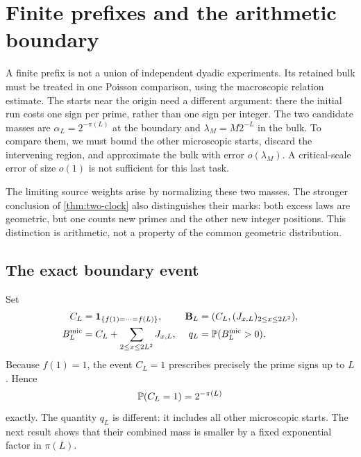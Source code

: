\section{Finite prefixes and the arithmetic boundary}\label{sec:global-prefix}
A finite prefix is not a union of independent dyadic experiments. Its
retained bulk must be treated in one Poisson comparison, using the
macroscopic relation estimate. The starts near the origin need a different
argument: there the initial run costs one sign per prime, rather than one
sign per integer. The two candidate masses are
$\alpha_L=2^{-\pi(L)}$ at the boundary and
$\lambda_M=M2^{-L}$ in the bulk. To compare them, we must bound the other
microscopic starts, discard the intervening region, and approximate the
bulk with error $o(\lambda_M)$. A critical-scale error of size $o(1)$ is
not sufficient for this last task.

The limiting source weights arise by normalizing these two masses.
The stronger conclusion of \cref{thm:two-clock} also distinguishes their
marks: both excess laws are geometric, but one counts new primes and the
other new integer positions. This distinction is arithmetic, not a
property of the common geometric distribution.

\subsection{The exact boundary event}
Set
\begin{align*}
 C_L&=\mathbf 1_{\{f(1)=\cdots=f(L)\}},&
 \mathbf B_L&=(C_L,(J_{x,L})_{2\le x\le2L^2}),\\
 B_L^{\rm mic}&=C_L+\sum_{2\le x\le2L^2}J_{x,L},&
 q_L&=\mathbb P(B_L^{\rm mic}>0).
\end{align*}
Because $f(1)=1$, the event $C_L=1$ prescribes precisely the prime signs
up to $L$. Hence
\begin{equation}\label{eq:exact-border}
 \mathbb P(C_L=1)=2^{-\pi(L)}
\end{equation}
exactly. The quantity $q_L$ is different: it includes all other microscopic
starts. The next result shows that their combined mass is smaller by a
fixed exponential factor in $\pi(L)$.

